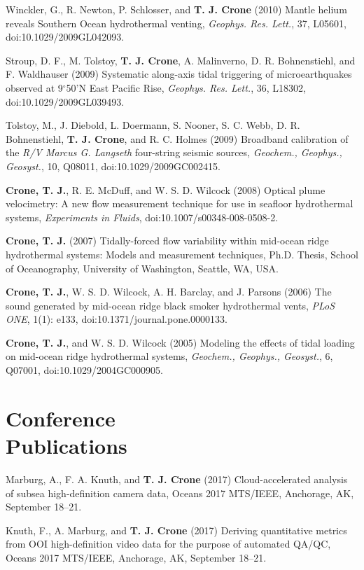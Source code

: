 \documentclass[11pt]{res}
\begin{document}
\begin{resume}
Winckler, G., R. Newton, P. Schlosser, and {\bf T. J. Crone} (2010) Mantle helium reveals Southern Ocean hydrothermal venting, {\em Geophys. Res. Lett.}, 37, L05601, doi:10.1029/2009GL042093.

Stroup, D. F., M. Tolstoy, {\bf T. J. Crone}, A. Malinverno, D. R. Bohnenstiehl, and F. Waldhauser (2009) Systematic along-axis tidal triggering of microearthquakes observed at 9$^\circ$50'N East Pacific Rise, {\em Geophys. Res. Lett.}, 36, L18302, doi:10.1029/2009GL039493.

Tolstoy, M., J. Diebold, L. Doermann, S. Nooner, S. C. Webb, D. R. Bohnenstiehl, {\bf T. J. Crone}, and R. C. Holmes (2009) Broadband calibration of the {\em R/V Marcus G. Langseth} four-string seismic sources, {\em Geochem., Geophys., Geosyst.}, 10, Q08011, doi:10.1029/2009GC002415.

{\bf Crone, T. J.}, R. E. McDuff, and W. S. D. Wilcock (2008) Optical plume velocimetry: A new flow measurement technique for use in seafloor hydrothermal systems, {\em Experiments in Fluids}, doi:10.1007/s00348-008-0508-2.

{\bf Crone, T. J.} (2007) Tidally-forced flow variability within mid-ocean ridge hydrothermal systems: Models and measurement techniques, Ph.D. Thesis, School of Oceanography, University of Washington, Seattle, WA, USA.

{\bf Crone, T. J.}, W. S. D. Wilcock, A. H. Barclay, and J. Parsons (2006) The sound generated by mid-ocean ridge black smoker hydrothermal vents, {\em PLoS ONE}, 1(1): e133, doi:10.1371/journal.pone.0000133.

{\bf Crone, T. J.}, and W. S. D. Wilcock (2005) Modeling the effects of tidal loading on mid-ocean ridge hydrothermal systems, {\em Geochem., Geophys., Geosyst.}, 6, Q07001, doi:10.1029/2004GC000905.

\section{\sc Conference\\Publications}

Marburg, A., F. A. Knuth, and {\bf T. J. Crone} (2017) Cloud-accelerated analysis of subsea high-definition camera data, Oceans 2017 MTS/IEEE, Anchorage, AK, September 18--21.

Knuth, F., A. Marburg, and {\bf T. J. Crone} (2017) Deriving quantitative metrics from OOI high-definition video data for the purpose of automated QA/QC, Oceans 2017 MTS/IEEE, Anchorage, AK, September 18--21.


\end{resume}
\end{document}
